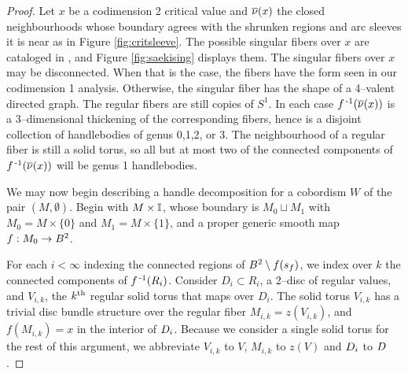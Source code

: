 \begin{proof}
	Let $x$ be a codimension 2 critical value and $\overline{\nu}(x)$ the closed neighbourhoods whose boundary agrees with the shrunken regions and arc sleeves it is near as in Figure \ref{fig:critsleeve}.
	The possible singular fibers over $x$ are cataloged in \cite{Saeki}, and Figure \ref{fig:saekising} displays them.
	The singular fibers over $x$ may be disconnected.
	When that is the case, the fibers have the form seen in our codimension 1 analysis.
	Otherwise, the singular fiber has the shape of a 4--valent directed graph.
	The regular fibers are still copies of $S^1$.
	In each case $f^{\,\text{-}1}(\overline{\nu}(x))$ is a 3--dimensional thickening of the corresponding fibers, hence is a disjoint collection of handlebodies of genus 0,1,2, or 3.
	The neighbourhood of a regular fiber is still a solid torus, so all but at most two of the connected components of $f^{\,\text{-}1}(\overline{\nu}(x))$ will be genus 1 handlebodies.
	

	
	We may now begin describing a handle decomposition for a cobordism $W$ of the pair $(M,\emptyset)$.
	Begin with $M\times\mathbb{I}$, whose boundary is $M_0\sqcup M_1$ with $M_0=M\times\{0\}$ and $M_1 = M\times\{1\}$, and a proper generic smooth map $f:M_0\to B^2$.

	For each $i<\infty$ indexing the connected regions of $B^2\setminus f(s_f)$, we index over $k$ the connected components of $f^{\,\text{-}1}(R_i)$.
	Consider $D_i\subset R_i$, a 2--disc of regular values, and $V_{i,k}$, the $k^{\text{th}}$ regular solid torus that maps over $D_i$.
	The solid torus $V_{i,k}$ has a trivial disc bundle structure over the regular fiber $M_{i,k}=z(V_{i,k})$, and $f(M_{i,k})=x$ in the interior of $D_i$.
	Because we consider a single solid torus for the rest of this argument, we abbreviate $V_{i,k}$ to $V$, $M_{i,k}$ to $z(V)$ and $D_i$ to $D$.


\end{proof}
